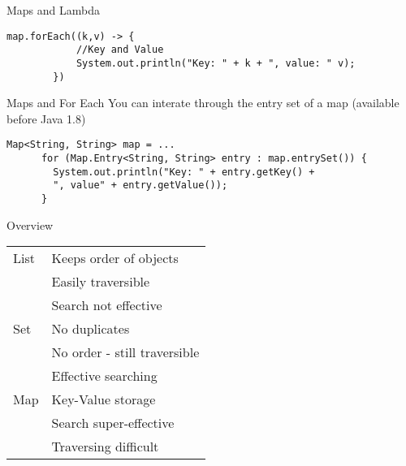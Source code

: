 \begin{frame}[fragile]{Maps and Lambda}
	\begin{lstlisting}[basicstyle=\ttfamily\scriptsize]
		map.forEach((k,v) -> {
			//Key and Value
			System.out.println("Key: " + k + ", value: " v);
		})
	\end{lstlisting}
\end{frame}

\begin{frame}[fragile]{Maps and For Each}
  You can interate through the entry set of a map (available before Java 1.8)
	\begin{lstlisting}[basicstyle=\ttfamily\scriptsize]
      Map<String, String> map = ...
      for (Map.Entry<String, String> entry : map.entrySet()) {
        System.out.println("Key: " + entry.getKey() +
        ", value" + entry.getValue());
      }
	\end{lstlisting}
\end{frame}

\begin{frame}{Overview}
	\begin{center}
		\begin{tabular}{ l | l }
			List & Keeps order of objects \\
				 & Easily traversible \\
				 & Search not effective \\
			\hline
			Set  & No duplicates \\
				 & No order - still traversible \\
				 & Effective searching \\
			\hline
			Map  & Key-Value storage \\
				 & Search super-effective \\
				 & Traversing difficult
			
		\end{tabular}
	\end{center}
\end{frame}

